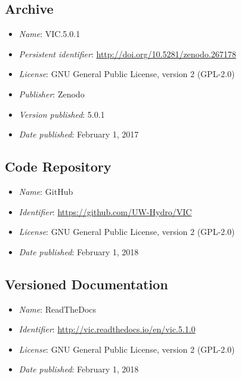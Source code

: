 \documentclass[gmd, manuscript]{copernicus}
\begin{document}
\subsection{Archive}

\begin{itemize}
	\item \textit{Name}: VIC.5.0.1
	\item \textit{Persistent identifier}: \url{http://doi.org/10.5281/zenodo.267178}
	\item \textit{License}: GNU General Public License, version 2 (GPL-2.0)
	\item \textit{Publisher}: Zenodo
	\item \textit{Version published}: 5.0.1
	\item \textit{Date published}: February 1, 2017
\end{itemize}

\subsection{Code Repository}

\begin{itemize}
	\item \textit{Name}: GitHub
	\item \textit{Identifier}: \url{https://github.com/UW-Hydro/VIC}
	\item \textit{License}: GNU General Public License, version 2 (GPL-2.0)
	\item \textit{Date published}: February 1, 2018
\end{itemize}

\subsection{Versioned Documentation}

\begin{itemize}
	\item \textit{Name}: ReadTheDocs
	\item \textit{Identifier}: \url{http://vic.readthedocs.io/en/vic.5.1.0}
	\item \textit{License}: GNU General Public License, version 2 (GPL-2.0)
	\item \textit{Date published}: February 1, 2018
\end{itemize}

\end{document}
